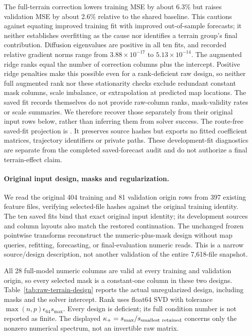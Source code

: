 \documentclass[11pt]{article}
\begin{document}
The full-terrain correction lowers training MSE by about 6.3\% but raises
validation MSE by about 2.6\% relative to the shared baseline. This cautions
against equating improved training fit with improved out-of-sample forecasts;
it neither establishes overfitting as the cause nor identifies a terrain
group's final contribution. Diffusion eigenvalues are positive in all ten
fits, and recorded relative gradient norms range from
\(3.88\times10^{-17}\) to \(5.13\times10^{-14}\). The augmented ridge ranks
equal the number of correction columns plus the intercept. Positive ridge
penalties make this possible even for a rank-deficient raw design, so neither
full augmented rank nor these stationarity checks exclude redundant constant
mask columns, scale imbalance, or extrapolation at predicted map locations.
The saved fit records themselves do not provide raw-column ranks, mask-validity
rates or scale summaries. We therefore recover those separately from their
original input rows below, rather than inferring them from solver success.
The route-free saved-fit projection is
. It preserves source hashes but
exports no fitted coefficient matrices, trajectory identifiers or private
paths. These development-fit diagnostics are separate from the completed
saved-forecast audit and do not authorize a final terrain-effect claim.

\paragraph{Original input design, masks and regularization.}
We read the original 404 training and 81 validation origin rows from 397
existing feature files, verifying selected-file hashes against the original
training identity. The ten saved fits bind that exact original input
identity; its development sources and column layouts also match the restored
continuation. The unchanged frozen pointwise transforms reconstruct the
numeric-plus-mask design without map queries, refitting, forecasting, or
final-evaluation numeric reads. This is a narrow source/design description,
not another validation of the entire 7,618-file snapshot.

All 28 full-model numeric columns are valid at every training and validation
origin, so every selected mask is a constant-one column in these two designs.
Table~\ref{tab:raw-terrain-design} reports the actual unregularized design,
including masks and the solver intercept. Rank uses float64 SVD with
tolerance \(\max(n,p)\epsilon_{64}s_{\max}\). Every design is deficient;
its full condition number is not reported as finite. The displayed
\(\kappa_{+}=s_{\max}/s_{\rm smallest\ retained}\) concerns only the
nonzero numerical spectrum, not an invertible raw matrix.
\end{document}
